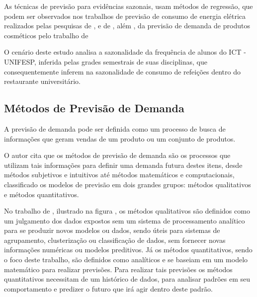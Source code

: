 As técnicas de previsão para evidências sazonais, usam métodos de regressão, que podem ser observados nos trabalhos de previsão de consumo de energia elétrica realizados pelas pesquisas de \cite{Almeida2013}, \cite{RUAS2012} e de \cite{Silva2010}, além , da previsão de demanda de produtos cosméticos pelo trabalho de \cite{Junior2007}

O cenário deste estudo analisa a sazonalidade da frequência de alunos do ICT - UNIFESP, inferida pelas grades semestrais de suas disciplinas, que consequentemente inferem na sazonalidade de consumo de refeições dentro do restaurante universitário.\newline

\subsection{Métodos de Previsão de Demanda} 

A previsão de demanda pode ser definida como um processo de busca de informações que geram vendas de um produto ou um conjunto de produtos.

O autor  cita que os métodos de previsão de demanda são os processos que utilizam tais informações para definir uma demanda futura destes itens, desde métodos subjetivos e intuitivos até métodos matemáticos e computacionais, classificado os modelos de previsão em dois grandes grupos: métodos qualitativos e métodos quantitativos.

No trabalho de \cite{Junior2007}, ilustrado na figura \label{fig:metodosPrevisaoDemanda}, os métodos qualitativos são definidos como um julgamento dos dados expostos sem um sistema de processamento analítico para se produzir novos modelos ou dados, sendo úteis para sistemas de agrupamento, clusterização ou classificação de dados, sem fornecer novas informações numéricas ou modelos preditivos. Já os métodos quantitativos, sendo o foco deste trabalho, são definidos como analíticos e se baseiam em um modelo matemático para realizar previsões. Para realizar tais previsões os métodos quantitativos necessitam de um histórico de dados, para analisar padrões em seu comportamento e predizer o futuro que irá agir dentro deste padrão.

          \begin{figure}[H]
          \end{figure}

